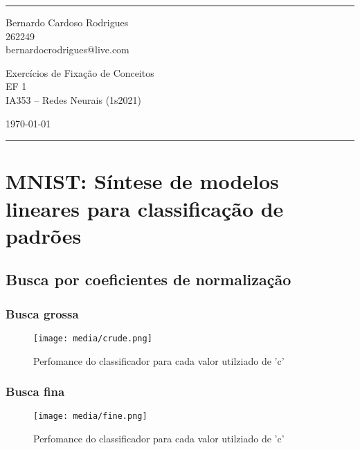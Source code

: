 \documentclass[a4paper]{article}
\begin{document}

\fancyhead[C]{}
\hrule \medskip %
\begin{minipage}{0.295\textwidth}
    \raggedright
    \footnotesize
    Bernardo Cardoso Rodrigues \hfill\\
    262249\hfill\\
    bernardocrodrigues@live.com
\end{minipage}
\begin{minipage}{0.4\textwidth}
    \centering
    \large
    Exercícios de Fixação de Conceitos \\EF 1\\
    \normalsize
    IA353 – Redes Neurais (1s2021)\\
\end{minipage}
\begin{minipage}{0.295\textwidth}
    \raggedleft
    \today\hfill\\
\end{minipage}
\medskip\hrule
\bigskip


\section{MNIST: Síntese de modelos lineares para classificação de padrões}
\subsection{Busca por coeficientes de normalização}

\subsubsection{Busca grossa}
\begin{figure}[H]
    \centering   %
    \centerline{\texttt{[image: media/crude.png]}}
    \caption{Perfomance do classificador para cada valor utilziado de 'c'}  %
    \label{fig:fig1}  %
\end{figure}

\subsubsection{Busca fina}
\begin{figure}[H]
    \centering   %
    \centerline{\texttt{[image: media/fine.png]}}
    \caption{Perfomance do classificador para cada valor utilziado de 'c'}  %
    \label{fig:fig2}  %
\end{figure}
\end{document}
